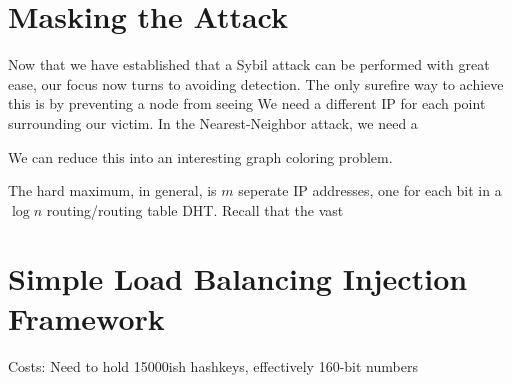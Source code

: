\documentclass[a4paper]{article}
\begin{document}
\section{Masking the Attack}
Now that we have established that a Sybil attack can be performed with great ease, our focus now turns to avoiding detection.
The only surefire way to achieve this is by preventing a node from seeing 
We need a different IP for each point surrounding our victim.  In the Nearest-Neighbor attack, we need a 

We can reduce this into an interesting graph coloring problem.


The hard maximum, in general, is $m$ seperate IP addresses, one for each bit in a $\log n$ routing/routing table DHT.
Recall that the vast


\section{Simple Load Balancing Injection Framework}

Costs:  Need to hold 15000ish hashkeys, effectively 160-bit numbers



\end{document}
